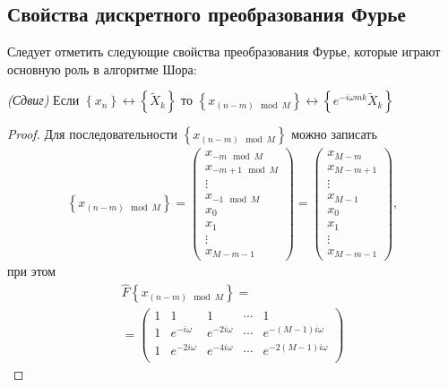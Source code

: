 \subsection{Свойства дискретного преобразования Фурье}
Следует отметить следующие свойства преобразования Фурье, которые
играют основную роль в алгоритме Шора:

\begin{lemma}
\emph{(Сдвиг)}
\label{lemmaAddFourierDiscretFourierShiftTime}
Если $\left\{x_n\right\} \longleftrightarrow \left\{\tilde{X}_k\right\}$ то
$\left\{x_{\left(n - m\right) \mod M}\right\} \longleftrightarrow
\left\{e^{-i \omega m k}\tilde{X}_k\right\}$ 
\end{lemma}

\begin{proof}
Для последовательности $\left\{x_{\left(n - m\right) \mod M}\right\}$
можно записать
\begin{eqnarray}
\left\{x_{\left(n - m\right) \mod M}\right\} = 
\begin{pmatrix}
x_{-m \mod M} \\
x_{-m+1 \mod M}\\ 
\vdots \\
x_{-1 \mod M}\\
x_0 \\
x_1 \\
\vdots \\
x_{M - m - 1}
\end{pmatrix} = 
\begin{pmatrix}
x_{M - m} \\
x_{M - m + 1}\\ 
\vdots \\
x_{M - 1}\\
x_0 \\
x_1 \\
\vdots \\
x_{M - m - 1}
\end{pmatrix},
\nonumber
\end{eqnarray}
при этом
\begin{eqnarray}
\hat{F}\left\{x_{\left(n - m\right) \mod M}\right\} = 
\nonumber \\
=
\begin{pmatrix}
1 & 1 & 1 & \cdots & 1 \\
1 & e^{-i \omega} & e^{-2 i \omega} & \cdots & 
e^{-\left( M - 1 \right) i \omega} \\
1 & e^{-2 i \omega} & e^{-4 i \omega} & \cdots & 
e^{-2 \left( M - 1 \right) i \omega} \\

\end{pmatrix}
\end{eqnarray}
\end{proof}
